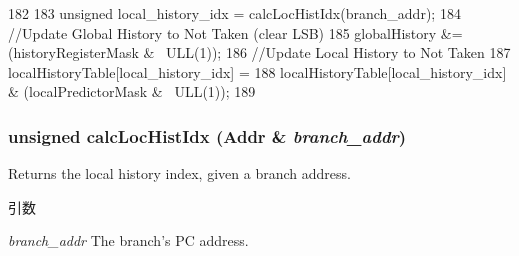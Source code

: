\begin{DoxyCode}
182 {
183     unsigned local_history_idx = calcLocHistIdx(branch_addr);
184     //Update Global History to Not Taken (clear LSB)
185     globalHistory &= (historyRegisterMask & ~ULL(1));
186     //Update Local History to Not Taken
187     localHistoryTable[local_history_idx] =
188        localHistoryTable[local_history_idx] & (localPredictorMask & ~ULL(1));
189 }
\end{DoxyCode}
\hypertarget{classTournamentBP_ae93fe8c8e3b6835f6fe2489f56600258}{
\subsubsection[{calcLocHistIdx}]{\setlength{\rightskip}{0pt plus 5cm}unsigned calcLocHistIdx ({\bf Addr} \& {\em branch\_\-addr})}}
\label{classTournamentBP_ae93fe8c8e3b6835f6fe2489f56600258}
Returns the local history index, given a branch address. 
\begin{DoxyParams}{引数}
\item[{\em branch\_\-addr}]The branch's PC address. \end{DoxyParams}



